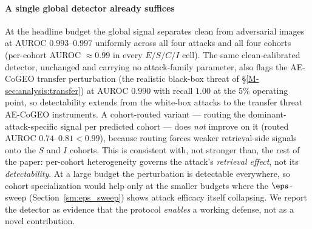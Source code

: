 \paragraph{A single global detector already suffices} At the headline budget the global signal separates clean from adversarial images at AUROC $0.993$--$0.997$ uniformly across all four attacks and all four cohorts (per-cohort AUROC $\approx 0.99$ in every $E/S/C/I$ cell). The same clean-calibrated detector, unchanged and carrying no attack-family parameter, also flags the AE-CoGEO transfer perturbation (the realistic black-box threat of \S\ref{M-sec:analysis:transfer}) at AUROC $0.990$ with recall $1.00$ at the $5\%$ operating point, so detectability extends from the white-box attacks to the transfer threat AE-CoGEO instruments. A cohort-routed variant --- routing the dominant-attack-specific signal per predicted cohort --- does \emph{not} improve on it (routed AUROC $0.74$--$0.81 < 0.99$), because routing forces weaker retrieval-side signals onto the $S$ and $I$ cohorts. This is consistent with, not stronger than, the rest of the paper: per-cohort heterogeneity governs the attack's \emph{retrieval effect}, not its \emph{detectability}. At a large budget the perturbation is detectable everywhere, so cohort specialization would help only at the smaller budgets where the $\eps$-sweep (Section~\ref{sm:eps_sweep}) shows attack efficacy itself collapsing. We report the detector as evidence that the protocol \emph{enables} a working defense, not as a novel contribution.

